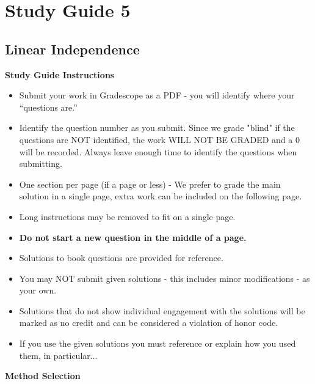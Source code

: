 \clearpage
\chapter{Study Guide 5}

\section{Linear Independence}

\begin{center}
    \large{\textbf{Study Guide Instructions}}
\end{center}


\begin{itemize}
    \item Submit your work in Gradescope as a PDF - you will identify where your “questions are.”
    \item Identify the question number as you submit.  Since we grade "blind" if the questions are NOT identified, the work WILL NOT BE GRADED and a 0 will be recorded. Always leave enough time to 
    identify the questions when submitting.
    \item One section per page (if a page or less) - We prefer to grade the main solution in a single page, extra work can be included on the following page.
    \item Long instructions may be removed to fit on a single page.
    \item \textbf{Do not start a new question in the middle of a page.}
    \item Solutions to book questions are provided for reference.
    \item You may NOT submit given solutions - this includes minor modifications - as your own.
    \item Solutions that do not show individual engagement with the solutions will be marked as no credit and can be considered a violation of honor code.
    \item If you use the given solutions you must reference or explain how you used them, in particular...
\end{itemize}


\begin{center}
    \large{\textbf{Method Selection}}
\end{center}


